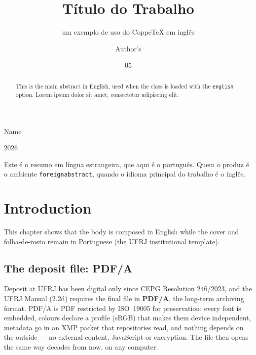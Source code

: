 \documentclass[english,dsc]{ufrj}
\begin{document}
  \title{Título do Trabalho}
  \subtitle{um exemplo de uso do CoppeTeX em inglês}
  \author{Author's}{Name}
  \date{05}{2026}
  \maketitle
  \frontmatter
  \begin{abstract}
    This is the main abstract in English, used when the class is loaded
    with the \texttt{english} option. Lorem ipsum dolor sit amet,
    consectetur adipiscing elit.
  \end{abstract}
  \begin{foreignabstract}
    Este é o resumo em língua estrangeira, que aqui é o português. Quem o
    produz é o ambiente \texttt{foreignabstract}, quando o idioma principal
    do trabalho é o inglês.
  \end{foreignabstract}
  \tableofcontents
  \mainmatter
  \chapter{Introduction}
  This chapter shows that the body is composed in English while the
  cover and folha-de-rosto remain in Portuguese (the UFRJ institutional
  template).
  \section{The deposit file: PDF/A}
  Deposit at UFRJ has been digital only since CEPG Resolution 246/2023, and the
  UFRJ Manual (2.2d) requires the final file in \textbf{PDF/A}, the long-term
  archiving format. PDF/A is PDF restricted by ISO~19005 for preservation: every
  font is embedded, colours declare a profile (sRGB) that makes them device
  independent, metadata go in an XMP packet that repositories read, and nothing
  depends on the outside --- no external content, JavaScript or encryption. The
  file then opens the same way decades from now, on any computer.
\end{document}
